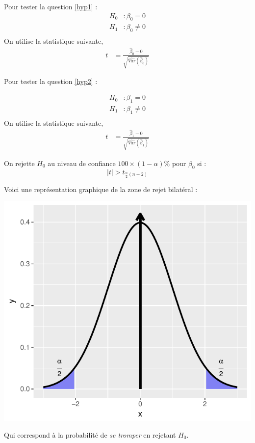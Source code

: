 \documentclass[11pt,french]{report}
\begin{document}
Pour tester la question \ref{hyp1} :
\begin{align*}
H_0 &: \beta_0 = 0 \\
H_1 &: \beta_0 \neq 0 \\
\end{align*}
On utilise la statistique suivante,
\begin{align*}
t &= \frac{\hat{\beta}_0 - 0 }{\sqrt{\widehat{Var}(\hat{\beta}_0)}}
\end{align*}

Pour tester la question  \ref{hyp2} :

\begin{align*}
H_0 &: \beta_1 = 0 \\
H_1 &: \beta_1 \neq 0 \\
\end{align*}
On utilise la statistique suivante,
\begin{align*}
t &= \frac{\hat{\beta}_1 - 0 }{\sqrt{\widehat{Var}(\hat{\beta}_1)}}
\end{align*}

On rejette $H_0$ au niveau de confiance $100 \times (1 - \alpha)\%$ pour $\beta_0$ si :
$$
|t| > t_{\frac{\alpha}{2}(n-2)}
$$

Voici une représentation graphique de la zone de rejet bilatéral :

\includegraphics{notes_de_cours-015}

Qui correspond à la probabilité de \emph{se tromper} en rejetant $H_0$.
\end{document}
